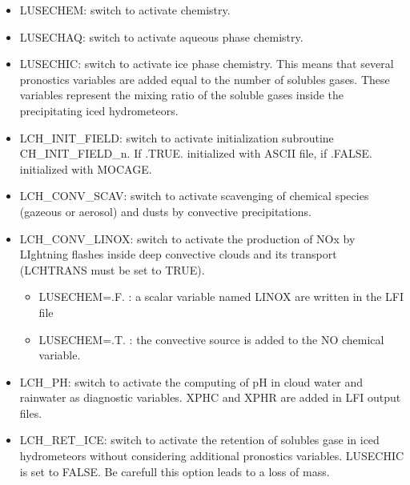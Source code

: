 \begin{itemize}

\item LUSECHEM: switch to activate chemistry.

\item  LUSECHAQ: switch to activate aqueous phase chemistry.

\item  LUSECHIC: switch to activate ice phase chemistry. This means that several pronostics variables are added equal to the number of solubles gases. These variables represent the mixing ratio of the soluble gases inside the precipitating iced hydrometeors.

\item  LCH\_INIT\_FIELD: switch to activate initialization subroutine CH\_INIT\_FIELD\_n. If .TRUE. initialized with ASCII file, if .FALSE. initialized with MOCAGE.

\item  LCH\_CONV\_SCAV: switch to activate scavenging of chemical species (gazeous or aerosol) and dusts by convective precipitations.

\item  LCH\_CONV\_LINOX: switch to activate the production of NOx by LIghtning flashes inside deep convective clouds and its transport (LCHTRANS must be set to TRUE).
\begin{itemize}
          \item  LUSECHEM=.F. : a scalar variable named LINOX are written in the LFI file
          \item  LUSECHEM=.T. : the convective source is added to the NO chemical variable.
\end{itemize}

\item  LCH\_PH: switch to activate the computing of pH in cloud water and rainwater as diagnostic variables. XPHC and XPHR are added in LFI output files.

\item  LCH\_RET\_ICE: switch to activate the retention of solubles gase in iced hydrometeors without considering additional pronostics variables. LUSECHIC is set to FALSE. Be carefull this option leads to a loss of mass.


\end{itemize}
